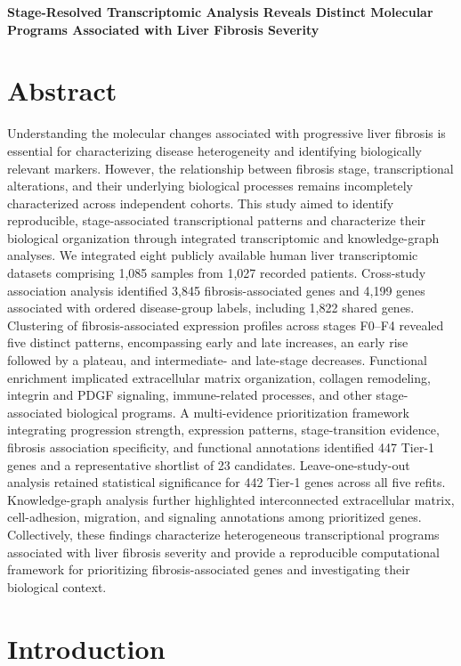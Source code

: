 \documentclass[11pt,a4paper]{article}
\begin{document}
{\centering\Large\bfseries Stage-Resolved Transcriptomic Analysis Reveals Distinct Molecular Programs Associated with Liver Fibrosis Severity\par}



\section*{Abstract}
Understanding the molecular changes associated with progressive liver fibrosis is essential for characterizing disease heterogeneity and identifying biologically relevant markers. However, the relationship between fibrosis stage, transcriptional alterations, and their underlying biological processes remains incompletely characterized across independent cohorts. This study aimed to identify reproducible, stage-associated transcriptional patterns and characterize their biological organization through integrated transcriptomic and knowledge-graph analyses. We integrated eight publicly available human liver transcriptomic datasets comprising 1,085 samples from 1,027 recorded patients. Cross-study association analysis identified 3,845 fibrosis-associated genes and 4,199 genes associated with ordered disease-group labels, including 1,822 shared genes. Clustering of fibrosis-associated expression profiles across stages F0–F4 revealed five distinct patterns, encompassing early and late increases, an early rise followed by a plateau, and intermediate- and late-stage decreases. Functional enrichment implicated extracellular matrix organization, collagen remodeling, integrin and PDGF signaling, immune-related processes, and other stage-associated biological programs. A multi-evidence prioritization framework integrating progression strength, expression patterns, stage-transition evidence, fibrosis association specificity, and functional annotations identified 447 Tier-1 genes and a representative shortlist of 23 candidates. Leave-one-study-out analysis retained statistical significance for 442 Tier-1 genes across all five refits. Knowledge-graph analysis further highlighted interconnected extracellular matrix, cell-adhesion, migration, and signaling annotations among prioritized genes. Collectively, these findings characterize heterogeneous transcriptional programs associated with liver fibrosis severity and provide a reproducible computational framework for prioritizing fibrosis-associated genes and investigating their biological context.
\section*{Introduction}
\end{document}
